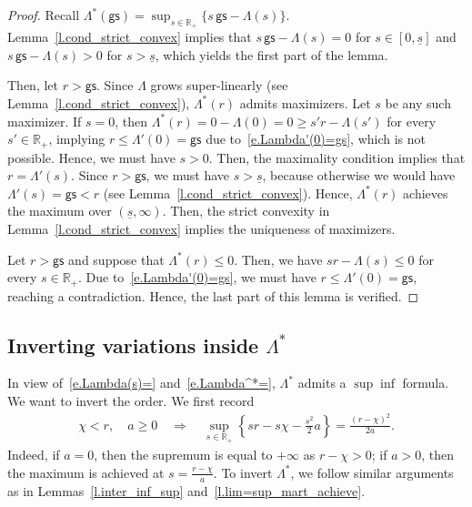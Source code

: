 \documentclass[11pt]{amsart}
\theoremstyle{remark}
\theoremstyle{definition}
\numberwithin{equation}{section}
\numberwithin{proposition}{section}
\numberwithin{figure}{section}
\numberwithin{table}{section}
\newcommand{\R}{\mathbb{R}}
\renewcommand{\leq}{\leqslant}
\renewcommand{\geq}{\geqslant}
\newcommand{\Ll}{\left}
\newcommand{\Rr}{\right}
\newcommand{\1}{\mathbf{1}}
\newcommand{\msf}{\mathsf}
\newcommand{\gs}{\msf {gs}}
\begin{document}
\begin{proof}
Recall $\Lambda^*(\gs)=\sup_{s\in\R_+}\{s \, \gs - \Lambda(s)\}$. Lemma~\ref{l.cond_strict_convex} implies that $s \, \gs - \Lambda(s)=0$ for $s\in[0,\underline s]$ and $s \, \gs - \Lambda(s)>0$ for $s>\underline s$, which yields the first part of the lemma.

Then, let $r>\gs$. Since $\Lambda$ grows super-linearly (see Lemma~\ref{l.cond_strict_convex}), $\Lambda^*(r)$ admits maximizers. Let $s$ be any such maximizer. If $s=0$, then $\Lambda^*(r)=0-\Lambda(0)=0\geq s'r-\Lambda(s')$ for every $s'\in \R_+$, implying $r\leq \Lambda'(0)=\gs$ due to~\eqref{e.Lambda'(0)=gs}, which is not possible. Hence, we must have $s>0$. Then, the maximality condition implies that $r=\Lambda'(s)$. Since $r>\gs$, we must have $s>\underline s$, because otherwise we would have $\Lambda'(s)=\gs <r$ (see Lemma~\ref{l.cond_strict_convex}). Hence, $\Lambda^*(r)$ achieves the maximum over $(\underline s,\infty)$. Then, the strict convexity in Lemma~\ref{l.cond_strict_convex} implies the uniqueness of maximizers.

Let $r>\gs$ and suppose that $\Lambda^*(r)\leq 0$. Then, we have $s r-\Lambda(s)\leq 0$ for every $s\in\R_+$. Due to~\eqref{e.Lambda'(0)=gs}, we must have $r\leq \Lambda'(0)=\gs$, reaching a contradiction. Hence, the last part of this lemma is verified.
\end{proof}


\subsection{Inverting variations inside \texorpdfstring{$\Lambda^*$}{Λ*}}

In view of~\eqref{e.Lambda(s)=} and~\eqref{e.Lambda^*=}, $\Lambda^*$ admits a $\sup\inf$ formula. We want to invert the order. We first record
\begin{align}\label{e.sup(sr-schi-s^2a/2=}
    \chi<r,\quad a \geq 0 \quad \Longrightarrow \quad \sup_{s\in\R_+}\Ll\{sr-s\chi - \frac{s^2}{2}a\Rr\} =  \frac{(r-\chi)^2}{2a}.
\end{align}
Indeed, if $a=0$, then the supremum is equal to $+\infty$ as $r-\chi>0$; if $a>0$, then the maximum is achieved at $s= \frac{r-\chi}{a}$. To invert $\Lambda^*$, we follow similar arguments as in Lemmas~\ref{l.inter_inf_sup} and~\ref{l.lim=sup_mart_achieve}.
\end{document}

